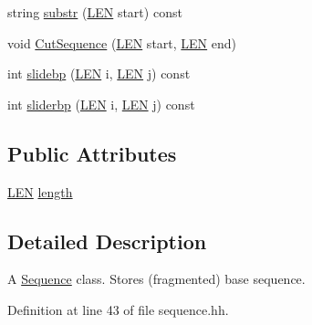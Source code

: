 \begin{DoxyCompactItemize}
\item 
string \hyperlink{class_rfold_1_1_parameter_1_1_sequence_a161d435f92ce632d19a04b6ecae30300}{substr} (\hyperlink{energy__const_8hh_a05b49c662c073f89e86804f7856622a0}{L\+E\+N} start) const 
\item 
void \hyperlink{class_rfold_1_1_parameter_1_1_sequence_a0a1a71514788ec342a185f04b9ca90f6}{Cut\+Sequence} (\hyperlink{energy__const_8hh_a05b49c662c073f89e86804f7856622a0}{L\+E\+N} start, \hyperlink{energy__const_8hh_a05b49c662c073f89e86804f7856622a0}{L\+E\+N} end)
\item 
int \hyperlink{class_rfold_1_1_parameter_1_1_sequence_a3fac33d4cc02dd9d50bbbe17c58840ca}{slidebp} (\hyperlink{energy__const_8hh_a05b49c662c073f89e86804f7856622a0}{L\+E\+N} i, \hyperlink{energy__const_8hh_a05b49c662c073f89e86804f7856622a0}{L\+E\+N} j) const 
\item 
int \hyperlink{class_rfold_1_1_parameter_1_1_sequence_a8e5c8d3ee721dc9964c383bbc4d19215}{sliderbp} (\hyperlink{energy__const_8hh_a05b49c662c073f89e86804f7856622a0}{L\+E\+N} i, \hyperlink{energy__const_8hh_a05b49c662c073f89e86804f7856622a0}{L\+E\+N} j) const 
\end{DoxyCompactItemize}
\subsection*{Public Attributes}
\begin{DoxyCompactItemize}
\item 
\hyperlink{energy__const_8hh_a05b49c662c073f89e86804f7856622a0}{L\+E\+N} \hyperlink{class_rfold_1_1_parameter_1_1_sequence_aa9e3bfb9862ce32ecc4ab2260e4dd40c}{length}
\end{DoxyCompactItemize}


\subsection{Detailed Description}
A \hyperlink{class_rfold_1_1_parameter_1_1_sequence}{Sequence} class. Stores (fragmented) base sequence. 

Definition at line 43 of file sequence.\+hh.



